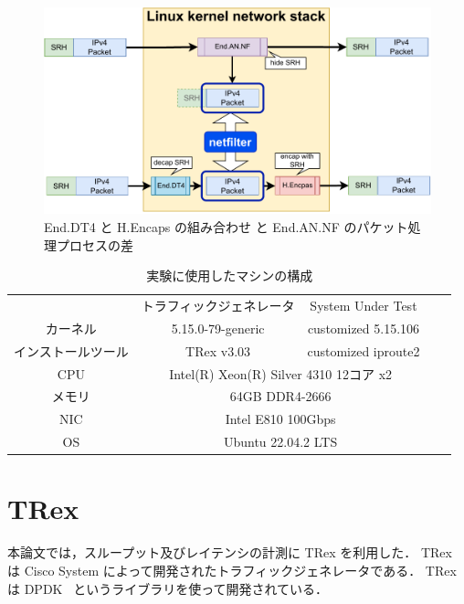 \begin{figure}[t]
    \centering
    \includegraphics[width=0.95\linewidth]{img/Diff.pdf}
    \caption{End.DT4 と H.Encaps の組み合わせ と End.AN.NF のパケット処理プロセスの差}
    \label{fig:diff}
\end{figure}

\begin{table}[t]
  \centering
  \caption{実験に使用したマシンの構成}
  \label{tbl:machines}
  \begin{tabular}{|c|c|c|cc}
  \cline{1-3}
          & トラフィックジェネレータ                   & System Under Test                  &  &  \\ \cline{1-3}
  カーネル & 5.15.0-79-generic              & customized 5.15.106              &  &  \\ \cline{1-3}
  インストールツール  & TRex v3.03                     & customized iproute2                  &  &  \\ \cline{1-3}
  CPU  & \multicolumn{2}{c|}{Intel(R) Xeon(R) Silver 4310 12コア x2}           &  &  \\ \cline{1-3}
  メモリ  & \multicolumn{2}{c|}{64GB DDR4-2666}                                 &  &  \\ \cline{1-3}
  NIC  & \multicolumn{2}{c|}{Intel E810 100Gbps}                             &  &  \\ \cline{1-3}
  OS   & \multicolumn{2}{c|}{Ubuntu 22.04.2 LTS} &  &  \\ \cline{1-3}
  \end{tabular}
  \end{table}

\section{TRex}
\label{sec:trex}
本論文では，スループット及びレイテンシの計測に TRex を利用した．
TRex は Cisco System によって開発されたトラフィックジェネレータである．
TRex は DPDK~\cite{dpdk} というライブラリを使って開発されている．

